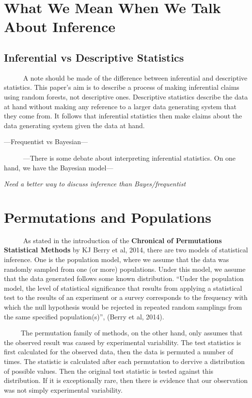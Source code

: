 \documentclass[12pt,twoside]{reedthesis}
\begin{document}
  \section{What We Mean When We Talk About
  Inference}\label{what-we-mean-when-we-talk-about-inference}
  
  \subsection{Inferential vs Descriptive
  Statistics}\label{inferential-vs-descriptive-statistics}
  
  ~~~~~ A note should be made of the difference between inferential and
  descriptive statistics. This paper's aim is to describe a process of
  making inferential claims using random forests, not descriptive ones.
  Descriptive statistics describe the data at hand without making any
  reference to a larger data generating system that they come from. It
  follows that inferential statistics then make claims about the data
  generating system given the data at hand.
  
  ---Frequentist vs Bayesian---
  
  ~~~~~ ---There is some debate about interpreting inferential statistics.
  On one hand, we have the Bayesian model---
  
  \emph{Need a better way to discuss inference than Bayes/frequentist}
  
  \section{Permutations and
  Populations}\label{permutations-and-populations}
  
  ~~~~~ As stated in the introduction of the \textbf{Chronical of
  Permutations Statistical Methods} by KJ Berry et al, 2014, there are two
  models of statistical inference. One is the population model, where we
  assume that the data was randomly sampled from one (or more)
  populations. Under this model, we assume that the data generated follows
  some known distribution. ``Under the population model, the level of
  statistical significance that results from applying a statistical test
  to the results of an experiment or a survey corresponds to the frequency
  with which the null hypothesis would be rejected in repeated random
  samplings from the same specified population(s)'', (Berry et al, 2014).
  
  ~~~~~The permutation family of methods, on the other hand, only assumes
  that the observed result was caused by experimental variability. The
  test statistics is first calculated for the observed data, then the data
  is permuted a number of times. The statistic is calculated after each
  permutation to dervive a distribution of possible values. Then the
  original test statistic is tested against this distribution. If it is
  exceptionally rare, then there is evidence that our observation was not
  simply experimental variability.
  
\end{document}
